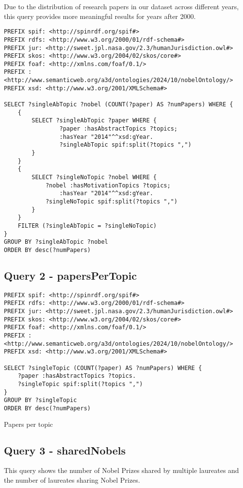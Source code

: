 \documentclass{article}
\begin{document}
Due to the distribution of research papers in our dataset across different years,
this query provides more meaningful results for years after 2000.

\begin{lstlisting}
PREFIX spif: <http://spinrdf.org/spif#>
PREFIX rdfs: <http://www.w3.org/2000/01/rdf-schema#>
PREFIX jur: <http://sweet.jpl.nasa.gov/2.3/humanJurisdiction.owl#>
PREFIX skos: <http://www.w3.org/2004/02/skos/core#>
PREFIX foaf: <http://xmlns.com/foaf/0.1/>
PREFIX : <http://www.semanticweb.org/a3d/ontologies/2024/10/nobelOntology/>
PREFIX xsd: <http://www.w3.org/2001/XMLSchema#>

SELECT ?singleAbTopic ?nobel (COUNT(?paper) AS ?numPapers) WHERE {
    {
        SELECT ?singleAbTopic ?paper WHERE {
        		?paper :hasAbstractTopics ?topics;
                :hasYear "2014"^^xsd:gYear.
        		?singleAbTopic spif:split(?topics ",")
        }
    }
    {
        SELECT ?singleNoTopic ?nobel WHERE {
            ?nobel :hasMotivationTopics ?topics;
                :hasYear "2014"^^xsd:gYear.
            ?singleNoTopic spif:split(?topics ",")
        }
    }
    FILTER (?singleAbTopic = ?singleNoTopic)
}
GROUP BY ?singleAbTopic ?nobel
ORDER BY desc(?numPapers)
\end{lstlisting}

\subsection*{Query 2 - papersPerTopic}

\begin{lstlisting}
PREFIX spif: <http://spinrdf.org/spif#>
PREFIX rdfs: <http://www.w3.org/2000/01/rdf-schema#>
PREFIX jur: <http://sweet.jpl.nasa.gov/2.3/humanJurisdiction.owl#>
PREFIX skos: <http://www.w3.org/2004/02/skos/core#>
PREFIX foaf: <http://xmlns.com/foaf/0.1/>
PREFIX : <http://www.semanticweb.org/a3d/ontologies/2024/10/nobelOntology/>
PREFIX xsd: <http://www.w3.org/2001/XMLSchema#>

SELECT ?singleTopic (COUNT(?paper) AS ?numPapers) WHERE {
    ?paper :hasAbstractTopics ?topics.
    ?singleTopic spif:split(?topics ",")
}
GROUP BY ?singleTopic
ORDER BY desc(?numPapers)    
\end{lstlisting}

Papers per topic

\subsection*{Query 3 - sharedNobels}
This query shows the number of Nobel Prizes shared by multiple laureates
and the number of laureates sharing Nobel Prizes.
\end{document}
